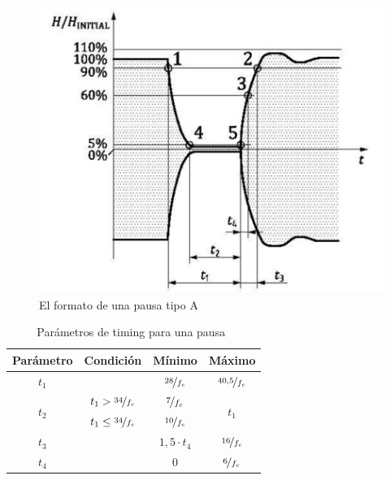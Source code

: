 \documentclass[a4paper, twoside, 11pt]{report}
\begin{document}
\begin{figure}[htb]
  \centering
  \includegraphics[scale=0.6]{./img/pause}
  \caption{El formato de una pausa tipo A~\cite{iso14443-2}}
  \label{fig:pause}
\end{figure}

\begin{table}[htb]
\centering
\begin{tabular}{|c|c|c|c|}
  \hline
  \textbf{Parámetro} & \textbf{Condición} & \textbf{Mínimo} & \textbf{Máximo} \\
  \hline
  $t_1$                   &                               & $\nicefrac{28}{f_c}$  & $\nicefrac{40,5}{f_c}$    \\
  \multirow{2}{*}{$t_2$}  & $t_1 > \nicefrac{34}{f_c}$  & $\nicefrac{7}{f_c}$   & \multirow{2}{*}{$t_1$}    \\
                          & $t_1 \le \nicefrac{34}{f_c}$  & $\nicefrac{10}{f_c}$  &                           \\
  $t_3$                   &                               & $1,5 \cdot t_4$           & $\nicefrac{16}{f_c}$      \\
  $t_4$                   &                               & 0                     & $\nicefrac{6}{f_c}$       \\
  \hline
\end{tabular}
\caption{Parámetros de timing para una pausa~\cite{iso14443-2}}
\label{tab:pause_values}
\end{table}
\end{document}
